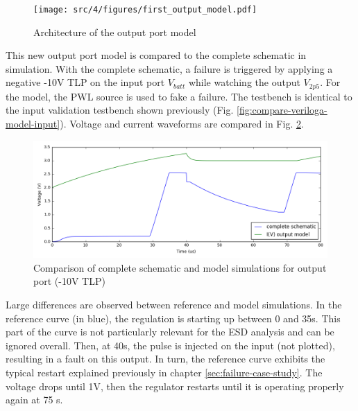 \begin{figure}[!h]
  \centering
  \texttt{[image: src/4/figures/first\_output\_model.pdf]}
  \caption{Architecture of the output port model}
  \label{fig:first-output-model}
\end{figure}

This new output port model is compared to the complete schematic in simulation.
With the complete schematic, a failure is triggered by applying a negative -10V TLP on the input port $V_{batt}$ while watching the output $V_{2p5}$.
For the model, the PWL source is used to fake a failure.
The testbench is identical to the input validation testbench shown previously (Fig. \ref{fig:compare-veriloga-model-input}).
Voltage and current waveforms are compared in Fig. \ref{fig:compare-model-simu-m10-output}.

\begin{figure}[!h]
  \centering
  \includegraphics[width=\textwidth]{src/4/figures/comparison_model_total_output_bad_m10V.png}
  \caption{Comparison of complete schematic and model simulations for output port (-10V TLP)}
  \label{fig:compare-model-simu-m10-output}
\end{figure}

Large differences are observed between reference and model simulations.
In the reference curve (in blue), the regulation is starting up between 0 and 35\textmu{}s.
This part of the curve is not particularly relevant for the ESD analysis and can be ignored overall.
Then, at 40\textmu{}s, the pulse is injected on the input (not plotted), resulting in a fault on this output.
In turn, the reference curve exhibits the typical restart explained previously in chapter \ref{sec:failure-case-study}.
The voltage drops until 1V, then the regulator restarts until it is operating properly again at 75 \textmu{}s.

